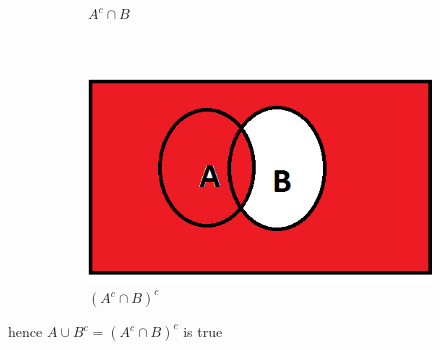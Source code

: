 \documentclass[a4paper,11pt]{report}
\begin{document}
\begin{figure}[hb]
\begin{subfigure}[b]{0.25\textwidth}
        \caption{$A^c\cap B$}
        \label{fig:mouse}
    \end{subfigure}
 ~
    \begin{subfigure}[b]{0.25\textwidth}
        \includegraphics[width=\textwidth]{AcnBc}
        \caption{$(A^c \cap B)^c$}
        \label{fig:mouse}
    \end{subfigure}
    \caption{}
\end{figure}
hence $A \cup B^c = (A^c\cap B)^c$ is true
\end{document}
